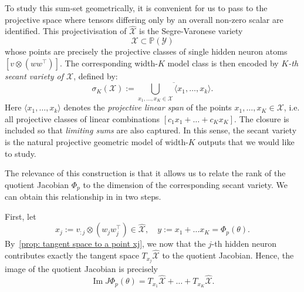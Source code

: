 To study this sum-set geometrically, it is convenient for us to pass to the projective space where tensors differing only by an overall non-zero scalar are identified.
This projectivisation of $\widehat{\mathcal X}$ is the Segre-Varonese variety
\begin{equation*}
    \mathcal X \subset \mathbb{P}(\mathcal Y)
\end{equation*}
whose points are precisely the projective classes of single hidden neuron atoms $[v \otimes (ww^{\top})].$
The corresponding width-$K$ model class is then encoded by \textit{$K$-th secant variety of $\mathcal X$}, defined by:
\begin{equation}
    \sigma_{K}(\mathcal X) := \overline{\bigcup_{x_{1}, \dots, x_{K}\in \mathcal X} \langle x_{1}, \dots, x_{k} \rangle}.
\end{equation}
Here $\langle x_{1}, \dots, x_{k} \rangle$ denotes the \textit{projective linear span} of the points $x_{1}, \dots, x_{K}\in \mathcal X$, i.e. all projective classes of linear combinations $[c_{1}x_{1} + \dots + c_{K}x_{K}]$.
The closure is included so that \textit{limiting sums} are also captured.
In this sense, the secant variety is the natural projective geometric model of width-$K$ outputs that we would like to study.

The relevance of this construction is that it allows us to relate the rank of the quotient Jacobian $\Phi_{p}$ to the dimension of the corresponding secant variety.
We can obtain this relationship in in two steps.

First, let
\begin{equation}
    x_{j}:= v_{:j} \otimes (w_{j}w_{j}^{\top}) \in \widehat{\mathcal X}, \quad y:= x_{1} + \dots x_{K} = \Phi_{p}(\theta).
\end{equation}
By~\cref{prop: tangent space to a point xj}, we now that the $j$-th hidden neuron contributes exactly the tangent space $T_{x_{j}}\widehat{\mathcal X}$ to the quotient Jacobian.
Hence, the image of the quotient Jacobian is precisely
\begin{equation}
    \operatorname{Im} J \Phi_{p}(\theta) = T_{x_{1}}\widehat{\mathcal X} + \dots + T_{x_{K}}\widehat{\mathcal X}.
\end{equation}

